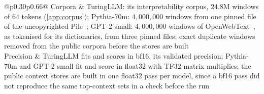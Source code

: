\documentclass[10pt]{article}
\newif\ifexternal
\DeclareRobustCommand{\pending}[1]{%
  \ifexternal
    \ifvmode\textcolor{black!55}{[to be added]}\else\unskip\fi
  \else
    \textcolor{red!70!black}{[\textit{pending: #1}]}%
  \fi}
\begin{document}
{\begin{longtable}{@{}p{0.30\linewidth}p{0.66\linewidth}@{}}
Corpora & TuringLLM: its interpretability corpus, $24.8$M windows of 64 tokens (\cref{app:corpus}); Pythia-70m: $4{,}000{,}000$ windows from one pinned file of the uncopyrighted Pile~\citep{gao2020pile}; GPT-2 small: $4{,}000{,}000$ windows of OpenWebText~\citep{gokaslan2019openwebtext}, as tokenised for its dictionaries, from three pinned files; exact duplicate windows removed from the public corpora before the stores are built \\
Precision & TuringLLM fits and scores in bf16, its validated precision; Pythia-70m and GPT-2 small fit and score in float32 with TF32 matrix multiplies; the public context stores are built in one float32 pass per model, since a bf16 pass did not reproduce the same top-context sets in a check before the run \\
\midrule
{} \\

\end{longtable}}
\end{document}
